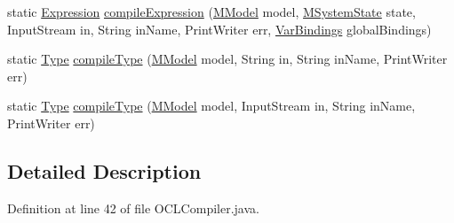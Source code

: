 \begin{DoxyCompactItemize}
\item 
static \hyperlink{classorg_1_1tzi_1_1use_1_1uml_1_1ocl_1_1expr_1_1_expression}{Expression} \hyperlink{classorg_1_1tzi_1_1use_1_1parser_1_1ocl_1_1_o_c_l_compiler_ab7627a831f107491682c9adcbeae7ca4}{compile\-Expression} (\hyperlink{classorg_1_1tzi_1_1use_1_1uml_1_1mm_1_1_m_model}{M\-Model} model, \hyperlink{classorg_1_1tzi_1_1use_1_1uml_1_1sys_1_1_m_system_state}{M\-System\-State} state, Input\-Stream in, String in\-Name, Print\-Writer err, \hyperlink{classorg_1_1tzi_1_1use_1_1uml_1_1ocl_1_1value_1_1_var_bindings}{Var\-Bindings} global\-Bindings)
\item 
static \hyperlink{interfaceorg_1_1tzi_1_1use_1_1uml_1_1ocl_1_1type_1_1_type}{Type} \hyperlink{classorg_1_1tzi_1_1use_1_1parser_1_1ocl_1_1_o_c_l_compiler_ab97030f1c3e3dc1734b67489a8ec355b}{compile\-Type} (\hyperlink{classorg_1_1tzi_1_1use_1_1uml_1_1mm_1_1_m_model}{M\-Model} model, String in, String in\-Name, Print\-Writer err)
\item 
static \hyperlink{interfaceorg_1_1tzi_1_1use_1_1uml_1_1ocl_1_1type_1_1_type}{Type} \hyperlink{classorg_1_1tzi_1_1use_1_1parser_1_1ocl_1_1_o_c_l_compiler_a4ed6916cbbaa972cd39d35ca8bc2a0a8}{compile\-Type} (\hyperlink{classorg_1_1tzi_1_1use_1_1uml_1_1mm_1_1_m_model}{M\-Model} model, Input\-Stream in, String in\-Name, Print\-Writer err)
\end{DoxyCompactItemize}


\subsection{Detailed Description}


Definition at line 42 of file O\-C\-L\-Compiler.\-java.




